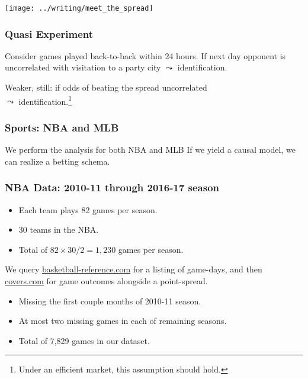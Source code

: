 \documentclass{beamer}
\begin{document}
\begin{frame}
  \centering   \texttt{[image: ../writing/meet\_the\_spread]} \end{frame}

\begin{frame}   \frametitle{Quasi Experiment}
  \begin{block}{Consider games played back-to-back within 24 hours.}     
    If next day opponent is uncorrelated with visitation to a party city $\leadsto$ identification.
    

    Weaker, still: if odds of beating the spread uncorrelated \\
    $\leadsto$ identification.\footnote{Under an efficient market, this assumption should hold.}    \end{block}  
\end{frame}

\begin{frame}   \frametitle{Sports: NBA and MLB}
  \begin{block}{We perform the analysis for both NBA and MLB}     If we yield a causal model, we can realize a betting schema.   \end{block} \end{frame}

\begin{frame}   \frametitle{NBA Data: 2010-11 through 2016-17 season}
  \begin{itemize}     \item Each team plays 82 games per season.
    \item 30 teams in the NBA.
    \item Total of $82 \times 30 / 2 = 1,230$ games per season.  
  \end{itemize}

  We query \href{http://www.basketball-reference.com/leagues/}{basketball-reference.com}
  for a listing of game-days, and then 
  \href{http://www.covers.com/sports/NBA/matchups?selectedDate=2011-1-01}{covers.com} for 
  game outcomes alongside a point-spread.

  \begin{itemize}     \item Missing the first couple months of 2010-11 season.
    \item At most two missing games in each of remaining seasons.
    \item Total of 7,829 games in our dataset.   \end{itemize}
\end{frame}
\end{document}
